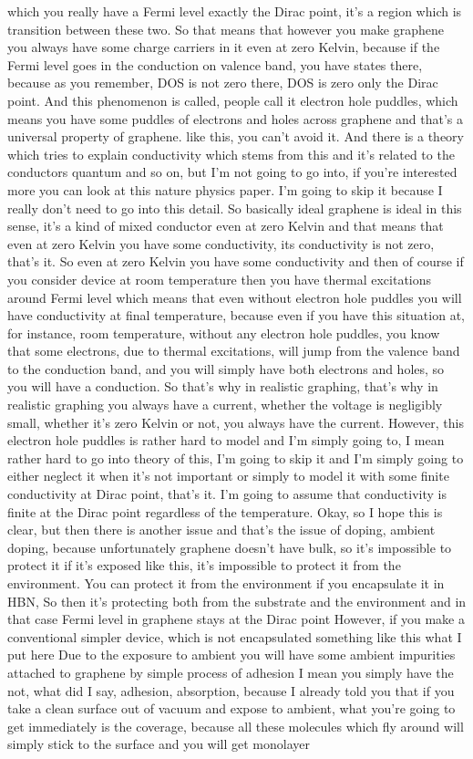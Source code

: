 which you really have a Fermi level exactly the Dirac point, it's a region which is transition between these two. So that means that however you make graphene you always have some charge carriers in it even at zero Kelvin, because if the Fermi level goes in the conduction on valence band, you have states there, because as you remember, DOS is not zero there, DOS is zero only the Dirac point. And this phenomenon is called, people call it electron hole puddles, which means you have some puddles of electrons and holes across graphene and that's a universal property of graphene. like this, you can't avoid it. And there is a theory which tries to explain conductivity which stems from this and it's related to the conductors quantum and so on, but I'm not going to go into, if you're interested more you can look at this nature physics paper. I'm going to skip it because I really don't need to go into this detail. So basically ideal graphene is ideal in this sense, it's a kind of mixed conductor even at zero Kelvin and that means that even at zero Kelvin you have some conductivity, its conductivity is not zero, that's it. So even at zero Kelvin you have some conductivity and then of course if you consider device at room temperature then you have thermal excitations around Fermi level which means that even without electron hole puddles you will have conductivity at final temperature, because even if you have this situation at, for instance, room temperature, without any electron hole puddles, you know that some electrons, due to thermal excitations, will jump from the valence band to the conduction band, and you will simply have both electrons and holes, so you will have a conduction. So that's why in realistic graphing, that's why in realistic graphing you always have a current, whether the voltage is negligibly small, whether it's zero Kelvin or not, you always have the current. However, this electron hole puddles is rather hard to model and I'm simply going to, I mean rather hard to go into theory of this, I'm going to skip it and I'm simply going to either neglect it when it's not important or simply to model it with some finite conductivity at Dirac point, that's it. I'm going to assume that conductivity is finite at the Dirac point regardless of the temperature. Okay, so I hope this is clear, but then there is another issue and that's the issue of doping, ambient doping, because unfortunately graphene doesn't have bulk, so it's impossible to protect it if it's exposed like this, it's impossible to protect it from the environment. You can protect it from the environment if you encapsulate it in HBN, So then it's protecting both from the substrate and the environment and in that case Fermi level in graphene stays at the Dirac point However, if you make a conventional simpler device, which is not encapsulated something like this what I put here Due to the exposure to ambient you will have some ambient impurities attached to graphene by simple process of adhesion I mean you simply have the not, what did I say, adhesion, absorption, because I already told you that if you take a clean surface out of vacuum and expose to ambient, what you're going to get immediately is the coverage, because all these molecules which fly around will simply stick to the surface and you will get monolayer 